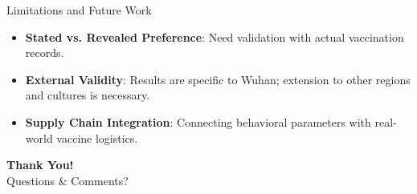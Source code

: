\documentclass[10pt, aspectratio=169, xcolor={svgnames}]{beamer}
\begin{document}
\begin{frame}{Limitations and Future Work}
    \begin{itemize}
        \item \textbf{Stated vs. Revealed Preference}: Need validation with actual vaccination records.
        \item \textbf{External Validity}: Results are specific to Wuhan; extension to other regions and cultures is necessary.
        \item \textbf{Supply Chain Integration}: Connecting behavioral parameters with real-world vaccine logistics.
    \end{itemize}
\end{frame}

\begin{frame}[plain]
    \centering
    \Huge \color{utdgreen} \textbf{Thank You!} \\
    \vspace{1cm}
    \large Questions \& Comments?
\end{frame}
\end{document}
